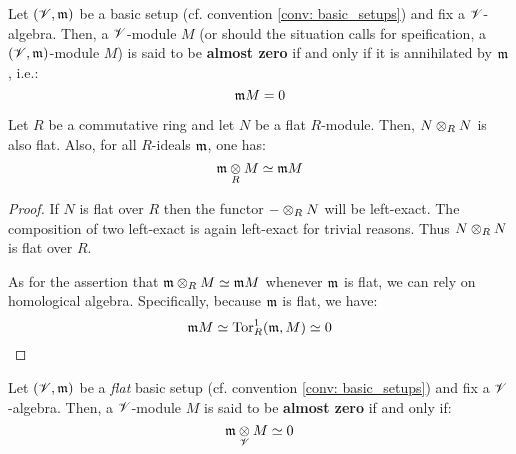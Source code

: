             \begin{definition} \label{def: almost_zero_modules}
                Let $(\mathscr{V}, \mathfrak{m})$ be a basic setup (cf. convention \ref{conv: basic_setups}) and fix a $\mathscr{V}$-algebra. Then, a $\mathscr{V}$-module $M$ (or should the situation calls for speification, a $(\mathscr{V}, \mathfrak{m})$-module $M$) is said to be \textbf{almost zero} if and only if it is annihilated by $\mathfrak{m}$, i.e.:
                    $$\mathfrak{m} M = 0$$
            \end{definition}
            \begin{lemma} \label{lemma: tensor_powers_of_flat_modules}
                Let $R$ be a commutative ring and let $N$ be a flat $R$-module. Then, $N \tensor_R N$ is also flat. Also, for all $R$-ideals $\mathfrak{m}$, one has:
                    $$\m \tensor_R M \cong \m M$$
            \end{lemma}
                \begin{proof}
                    If $N$ is flat over $R$ then the functor $- \tensor_R N$ will be left-exact. The composition of two left-exact is again left-exact for trivial reasons. Thus $N \tensor_R N$ is flat over $R$.
                    
                    As for the assertion that $\m \tensor_R M \cong \m M$ whenever $\mathfrak{m}$ is flat, we can rely on homological algebra. Specifically, because $\mathfrak{m}$ is flat, we have:
                        $$\mathfrak{m} M \simeq \mathrm{Tor}_R^1(\mathfrak{m}, M) \simeq 0$$
                \end{proof}
            \begin{proposition} \label{prop: almost_zero_module_alt_def}
                Let $(\mathscr{V}, \mathfrak{m})$ be a \textit{flat} basic setup (cf. convention \ref{conv: basic_setups}) and fix a $\mathscr{V}$-algebra. Then, a $\mathscr{V}$-module $M$ is said to be \textbf{almost zero} if and only if:
                    $$\m \tensor_{\scrV} M  \cong0$$
            \end{proposition}
